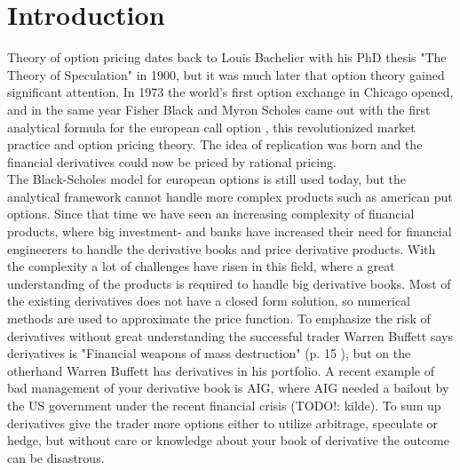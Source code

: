 
\chapter{Introduction} %

\label{Chapter1} %

Theory of option pricing dates back to Louis Bachelier with his PhD thesis "The Theory of Speculation" in 1900, but it was much later that option theory gained significant attention. In 1973 the world's first option exchange in Chicago opened, and in the same year Fisher Black and Myron Scholes came out with the first analytical formula for the european call option \parencite{B-S-Paper}, this revolutionized market practice and option pricing theory. The idea of replication was born and the financial derivatives could now be priced by rational pricing. \\

The Black-Scholes model for european options is still used today, but the analytical framework cannot handle more complex products such as american put options. Since that time we have seen an increasing complexity of financial products, where big investment- and banks have increased their need for financial engineerers to handle the derivative books and price derivative products. With the complexity a lot of challenges have risen in this field, where a great understanding of the products is required to handle big derivative books. Most of the existing derivatives does not have a closed form solution, so numerical methods are used to approximate the price function. To emphasize the risk of derivatives without great understanding the successful trader Warren Buffett says derivatives is "Financial weapons of mass destruction" (p. 15 \parencite{Buffett02}), but on the otherhand Warren Buffett has derivatives in his portfolio. A recent example of bad management of your derivative book is AIG, where AIG needed a bailout by the US government under the recent financial crisis (TODO!: kilde). To sum up derivatives give the trader more options either to utilize arbitrage, speculate or hedge, but without care or knowledge about your book of derivative the outcome can be disastrous.\\

